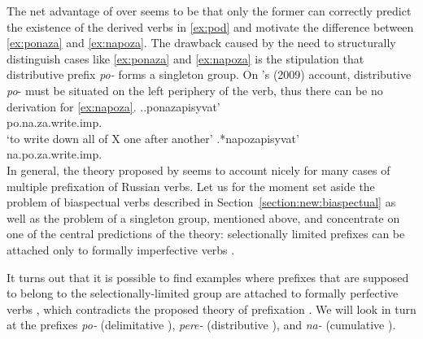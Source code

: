 The net advantage of \citet{Tatevosov:09} over \citet{Tatevosov:07} seems to be that only the former can correctly predict the existence of the derived verbs in \ref{ex:pod} and motivate the difference between \ref{ex:ponaza} and \ref{ex:napoza}. The drawback caused by the need to structurally distinguish cases like \ref{ex:ponaza} and \ref{ex:napoza} is the stipulation that distributive  prefix \textit{po-}   forms a singleton group. On \citeauthor{Tatevosov:09}'s (2009) account, distributive  \textit{po}- must be situated on the left periphery  of the verb, thus there can be no derivation for \ref{ex:napoza}.
\ex.\ag.\label{ex:ponaza}ponazapisyvat'\\
po.na.za.write.imp.\\
\trans `to write down all of X one after another'
\bg.\label{ex:napoza}*napozapisyvat'\\
na.po.za.write.imp.\\

In general, the theory proposed by \citet{Tatevosov:09} seems to account nicely for many cases of multiple prefixation  of Russian verbs. Let us for the moment set aside the problem of biaspectual verbs  described in Section~\ref{section:new:biaspectual} as well as the problem of a singleton group, mentioned above, and concentrate on one of the central predictions of the theory: selectionally limited prefixes  can be attached only to formally imperfective verbs .

It turns out that it is possible to find examples where prefixes that are supposed to belong to the selectionally-limited group are attached to formally perfective verbs , which contradicts the proposed theory of prefixation . We will look in turn at the prefixes \textit{po-}   (delimitative ), \textit{pere-}   (distributive ), and \textit{na-}   (cumulative ). 

